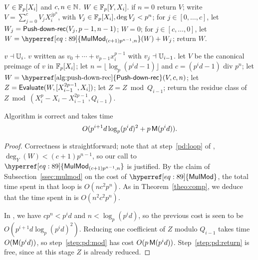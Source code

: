 \begin{algorithm}
  \caption{\label{alg:push-down-rec}}
  \begin{algorithmic}[1]
    \REQUIRE $V\in \mathbb{F}_p[X_i]$ and $c,n\in\mathbb{N}$.
    \ENSURE $W \in\mathbb{F}_p[Y,X_i]$.
    \STATE if $n=0$ return $V$;
    \STATE write $V=\sum_{j=0}^{c} V_j X_i^{jp^n}$, with $V_j \in \mathbb{F}_p[X_i], \deg V_j<p^n$;
    \STATE for $j\in [0,\dots,c]$, let $W_j=\text{{\sf Push-down-rec}}(V_j,p-1,n-1)$;
    \STATE $W=0$;
    \STATE\label{pd:loop} for $j\in [c,\dots,0]$, let $W = \hyperref[eq:89]{\alg{MulMod}_{(c+1)p^{n-1},n}}(W) + W_j$;
    \STATE return $W$.
  \end{algorithmic}
\end{algorithm}

\begin{algorithm}
  \caption{\label{alg:push-down}}
  \begin{algorithmic}[1]
    \REQUIRE $v\dashv \mathbb{U}_i$.
    \ENSURE $v$ written as $v_0+\cdots+v_{p-1}x_i^{p-1}$ with $v_j \dashv \mathbb{U}_{i-1}$.
    \STATE let $V$ be the canonical preimage of $v$ in $\mathbb{F}_p[X_i]$;
    \STATE let $n=\lfloor \log_p(p^id-1) \rfloor$ and $c=(p^id-1)\text{ div } p^n$;
    \STATE let $W = \text{\hyperref[alg:push-down-rec]{\alg{Push-down-rec}}}(V,c,n)$;
    \STATE let $Z = {\sf Evaluate}(W,[X_{i-1}^{2p-1},X_i])$;
    \STATE \label{step:pd:mod} let $Z = Z \bmod Q_{i-1}$;
    \STATE \label{step:pd:return} return the residue class of $Z \bmod (X_i^p - X_i - X_{i-1}^{2p-1},Q_{i-1})$.
  \end{algorithmic}
\end{algorithm}

\begin{proposition}\label{prop:pd}
  Algorithm \hyperref[alg:push-down]{} is correct and takes time 
  \begin{equation}
    \label{eq:92}
    O(p^{i+1}d
    \log_p(p^id)^2 + p\,\mathsf{M}(p^id))
    \text{.}
  \end{equation}
\end{proposition}
\begin{proof}
  Correctness is straightforward; note that at step~\ref{pd:loop} of
  \hyperref[alg:push-down-rec]{}, $\deg_Y(W) < (c+1)p^{n-1}$, so our call to
  $\hyperref[eq:89]{\alg{MulMod}_{(c+1)p^{n-1},n}}$ is justified. By
  the claim of Subsection~\ref{ssec:mulmod} on the cost of
  $\hyperref[eq:89]{\alg{MulMod}}$, the total time spent in that loop is
  $O(nc^2p^n)$. As in Theorem~\ref{theo:comp}, we deduce that the time
  spent in \hyperref[alg:push-down-rec]{} is $O(n^2c^2p^n)$.

  In \hyperref[alg:push-down]{}, we have $cp^n< p^id$ and $n<\log_p (p^id)$, so
  the previous cost is seen to be $O(p^{i+1}d
  \log_p(p^id)^2)$. Reducing one coefficient of $Z$ modulo $Q_{i-1}$
  takes time $O(\mathsf{M}(p^id))$, so step~\ref{step:pd:mod} has cost
  $O(p\,\mathsf{M}(p^id))$. Step~\ref{step:pd:return} is free, since at
  this stage $Z$ is already reduced. 
\end{proof}

